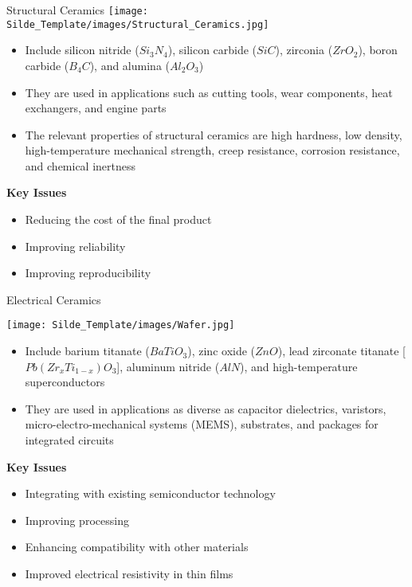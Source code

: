 \documentclass{libs/XJTLU_format}
\begin{document}
\begin{frame}{Structural Ceramics}
    \centering
    \texttt{[image: Silde\_Template/images/Structural\_Ceramics.jpg]}
\begin{itemize}
    \item Include silicon nitride ($Si_3N_4$), silicon carbide ($SiC$), zirconia ($ZrO_2$), boron carbide ($B_4C$), and alumina ($Al_2O_3$)
    \pause
    \item They are used in applications such as cutting tools, wear components, heat exchangers, and engine parts
    \pause
    \item The relevant properties of structural ceramics are high hardness, low density, high-temperature mechanical strength, creep resistance, corrosion resistance, and chemical inertness
    \pause
\end{itemize}
\vspace{1em}

\textbf{Key Issues}
\begin{itemize}
    \item Reducing the cost of the final product
    \item Improving reliability
    \item Improving reproducibility
\end{itemize}

\end{frame}

\begin{frame}{Electrical Ceramics}

\centering
\texttt{[image: Silde\_Template/images/Wafer.jpg]}

\begin{itemize}
    \item Include barium titanate ($BaTiO_3$), zinc oxide ($ZnO$), lead zirconate titanate [$Pb(Zr_xTi_{1-x})O_3$], aluminum nitride ($AlN$), and high-temperature superconductors \pause
    \item They are used in applications as diverse as capacitor dielectrics, varistors, micro-electro-mechanical systems (MEMS), substrates, and packages for integrated circuits \pause
\end{itemize}

\textbf{Key Issues}
\begin{itemize}
    \item Integrating with existing semiconductor technology
    \item Improving processing
    \item Enhancing compatibility with other materials
    \item Improved electrical resistivity in thin films
\end{itemize}

\end{frame}
\end{document}
